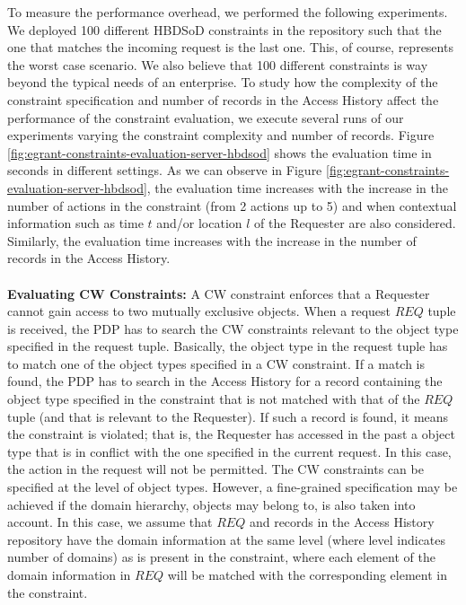 \documentclass[epsfig,a4paper,11pt,titlepage]{book}
\numberwithin{algorithm}{chapter}
\begin{document}
To measure the performance overhead, we performed the following experiments. We deployed 100 different \gls{HBDSoD} constraints in the repository such that the one that matches the incoming request is the last one. This, of course, represents the worst case scenario. We also believe that 100 different constraints is way beyond the typical needs of an enterprise. To study how the complexity of the constraint specification and number of records in the Access History affect the performance of the constraint evaluation, we execute several runs of our experiments varying the constraint complexity and number of records. Figure \ref{fig:egrant-constraints-evaluation-server-hbdsod} shows the evaluation time in seconds in different settings. As we can observe in Figure \ref{fig:egrant-constraints-evaluation-server-hbdsod}, the evaluation time increases with the increase in the number of actions in the constraint (from 2 actions up to 5) and when contextual information such as time $t$ and/or location $l$ of the Requester are also considered. Similarly, the evaluation time increases with the increase in the number of records in the Access History. \\ \\
\noindent \textbf{Evaluating \gls{CW} Constraints:} A \gls{CW} constraint enforces that a Requester cannot gain access to two mutually exclusive objects. When a request $\mathit{REQ}$ tuple is received, the \gls{PDP} has to search the \gls{CW} constraints relevant to the object type specified in the request tuple. Basically, the object type in the request tuple has to match one of the object types specified in a \gls{CW} constraint. If a match is found, the \gls{PDP} has to search in the Access History for a record containing the object type specified in the constraint that is not matched with that of the $\mathit{REQ}$ tuple (and that is relevant to the Requester). If such a record is found, it means the constraint is violated; that is, the Requester has accessed in the past a object type that is in conflict with the one specified in the current request. In this case, the action in the request will not be permitted. The \gls{CW} constraints can be specified at the level of object types. However, a fine-grained specification may be achieved if the domain hierarchy, objects may belong to, is also taken into account. In this case, we assume that $\mathit{REQ}$ and records in the Access History repository have the domain information at the same level (where level indicates number of domains) as is present in the constraint, where each element of the domain information in $\mathit{REQ}$ will be matched with the corresponding element in the constraint.
\end{document}
